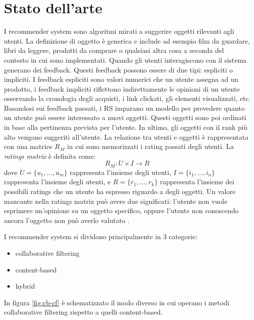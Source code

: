 \documentclass[12pt,italian]{report}
\begin{document}
\chapter{Stato dell'arte}
\label{chap:stato_arte}
I recommender system sono algoritmi mirati a suggerire oggetti rilevanti agli utenti. La definizione di oggetto è generica e include ad esempio film da guardare, libri da leggere, prodotti da comprare o qualsiasi altra cosa a seconda del contesto in cui sono implementati. 
Quando gli utenti interagiscono con il sistema generano dei feedback. Questi feedback possono essere di due tipi: espliciti o impliciti. I feedback espliciti sono valori numerici che un utente assegna ad un prodotto, i feedback impliciti riflettono indirettamente le opinioni di un utente osservando la cronologia degli acquisti, i link clickati, gli elementi visualizzati, etc.
Basandosi sui feedback passati, i RS imparano un modello per prevedere quanto un utente può essere interessato a nuovi oggetti. Questi oggetti sono poi ordinati in base alla pertinenza prevista per l'utente. In ultimo, gli oggetti con il rank più alto vengono suggeriti all'utente. La relazione tra utenti e oggetti è rappresentata con una matrice $R_M$ in cui sono memorizzati i rating passati degli utenti.
La \textit{ratings matrix} è definita come: 
$$
R_M: U \times I \rightarrow R
$$
dove $U = \{u_1, \dots, u_m\}$ rappresenta l'insieme degli utenti, $I = \{i_1,\dots, i_n\}$ rappresenta l'insieme degli utenti, e $R = \{r_1, \dots, r_k\}$ rappresenta l'insieme dei possibili ratings che un utente ha espresso riguardo a degli oggetti. Un valore mancante nella ratings matrix può avere due significati: l'utente non vuole esprimere un'opinione su un oggetto specifico, oppure l'utente non conoscendo ancora l'oggetto non può averlo valutato \cite{survey-mattia}.

\vspace{5mm}
\noindent I recommender system si dividono principalmente in 3 categorie:
\begin{itemize}
	\item collaborative filtering
	\item content-based
	\item hybrid
\end{itemize}

\noindent In figura \autoref{fig:cb-cf} è schematizzato il modo diverso in cui operano i metodi collaborative filtering rispetto a quelli content-based.
\end{document}

